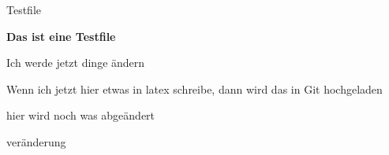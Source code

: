 \documentclass[10pt,a4paper]{article}
\begin{document}
\caption{Testfile}

\textbf{Das ist eine Testfile}

Ich werde jetzt dinge ändern

Wenn ich jetzt hier etwas in latex schreibe, dann wird das in Git hochgeladen

hier wird noch was abgeändert

veränderung
\end{document}
